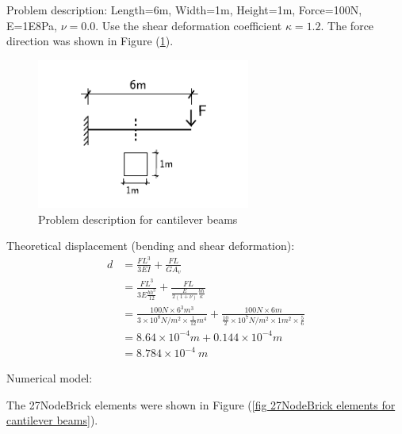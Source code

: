 \documentclass[fleqn,11pt]{article}
\begin{document}




Problem description: Length=6m, Width=1m, Height=1m, Force=100N, E=1E8Pa, $\nu=0.0$. Use the shear deformation coefficient $\kappa=1.2$. The force direction was shown in Figure (\ref{fig Problem description for cantilever 27}). 

\begin{figure}[H]
  \centering
  \includegraphics[width=7cm]{../Figure-files/cantilever_6.pdf}
  \caption{Problem description for cantilever beams}
  \label{fig Problem description for cantilever 27}
\end{figure}


Theoretical displacement (bending and shear deformation):
\begin{equation}
  \begin{aligned}
  d &=\frac{FL^3}{3EI}+\frac{FL}{GA_v} \\
  &= \frac{FL^3}{3E\frac{bh^3}{12}}+\frac{FL}{\frac{E}{2(1+\nu)} \frac{bh}{\kappa}} \\ 
    &= \frac{100 N \times 6^3 m^3}{3\times 10^8 N/m^2 \times \frac{1}{12} m^4}+ 
    \frac{100 N\times 6 m}{\frac{10}{2} \times 10^7 N/m^2\times 1 m^2 \times \frac{5}{6}} \\ 
    &=8.64\times 10^{-4} m + 0.144 \times 10^{-4} m   \\
   & =8.784\times 10^{-4} \ m
   \end{aligned}
\end{equation}



Numerical model:

The 27NodeBrick elements were shown in Figure (\ref{fig 27NodeBrick elements for cantilever beams}).
\end{document}
